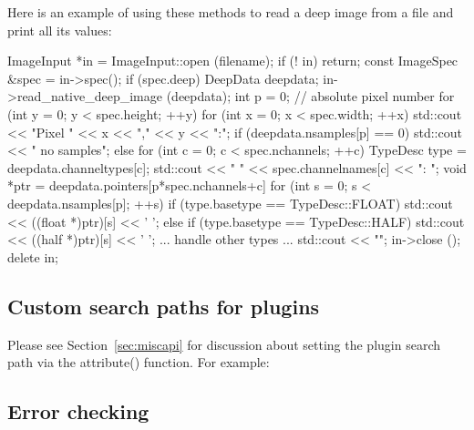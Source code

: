 Here is an example of using these methods to read a deep image from 
a file and print all its values:

\begin{code}
    ImageInput *in = ImageInput::open (filename);
    if (! in)
        return;
    const ImageSpec &spec = in->spec();
    if (spec.deep) {
        DeepData deepdata;
        in->read_native_deep_image (deepdata);
        int p = 0;  // absolute pixel number
        for (int y = 0; y < spec.height;  ++y) {
            for (int x = 0;  x < spec.width;  ++x) {
                std::cout << "Pixel " << x << "," << y << ":\n";
                if (deepdata.nsamples[p] == 0)
                    std::cout << "  no samples\n";
                else
                    for (int c = 0;  c < spec.nchannels;  ++c) {
                        TypeDesc type = deepdata.channeltypes[c];
                        std::cout << "  " << spec.channelnames[c] << ": ";
                        void *ptr = deepdata.pointers[p*spec.nchannels+c]
                        for (int s = 0;  s < deepdata.nsamples[p];  ++s) {
                            if (type.basetype == TypeDesc::FLOAT)
                                std::cout << ((float *)ptr)[s] << ' ';
                            else if (type.basetype == TypeDesc::HALF)
                                std::cout << ((half *)ptr)[s] << ' ';
                            ... handle other types ...
                        }
                        std::cout << "\n";
                    }
            }
        }
    }
    in->close ();
    delete in;
\end{code}


\subsection{Custom search paths for plugins}
\label{sec:imageinput:searchpaths}

Please see Section~\ref{sec:miscapi} for discussion
about setting the plugin search path via the {\cf attribute()} function.
For example:



\subsection{Error checking}
\label{sec:imageinput:errors}

